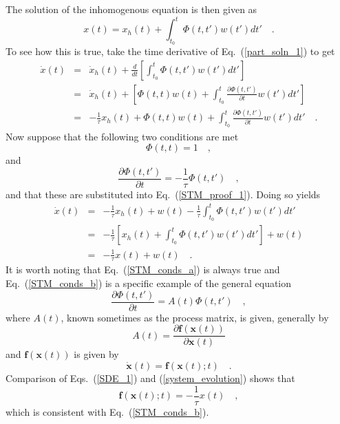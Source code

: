 \documentclass[10pt]{article}
\begin{document}
The solution of the inhomogenous equation is then given as
\begin{equation}\label{part_soln_1}
   x(t) = x_{h}(t) + \int_{t_{0}}^{t} \Phi(t,t') w(t') dt' \quad .
\end{equation}
To see how this is true, take the time derivative of Eq.\ (\ref{part_soln_1})
to get
\begin{eqnarray}\label{STM_proof_1}
  {\dot x}(t) & = & {\dot x}_{h}(t) + \frac{d}{dt} \left[ \int_{t_{0}}^{t} \Phi(t,t') w(t') dt' \right] \nonumber \\
              & = & {\dot x}_{h}(t) + \left[ \Phi(t,t) w(t) + \int_{t_{0}}^{t} \frac{\partial \Phi(t,t')}{\partial t} w(t') dt' \right] \nonumber \\
			  & = & -\frac{1}{\tau} x_{h}(t) + \Phi(t,t) w(t) + \int_{t_{0}}^{t} \frac{\partial \Phi(t,t')}{\partial t} w(t') dt' \quad .
\end{eqnarray}
Now suppose that the following two conditions are met
\begin{equation}\label{STM_conds_a}
   \Phi(t,t) = 1 \quad , 			
\end{equation}
and
\begin{equation}\label{STM_conds_b}
   \frac{\partial \Phi(t,t')}{\partial t} = -\frac{1}{\tau} \Phi(t,t') \quad ,
\end{equation}
and that these are substituted into Eq.\ (\ref{STM_proof_1}).  Doing so yields
\begin{eqnarray}\label{STM_proof_2}
  {\dot x}(t) & = & -\frac{1}{\tau} x_{h}(t) + w(t) - \frac{1}{\tau} \int_{t_{0}}^{t} \Phi(t,t') w(t') dt' \nonumber \\
              & = & -\frac{1}{\tau} \left[ x_{h}(t) + \int_{t_{0}}^{t} \Phi(t,t') w(t') dt' \right] + w(t) \nonumber \\
              & = & -\frac{1}{\tau} x(t) + w(t) \quad .
\end{eqnarray}
It is worth noting that Eq.\ (\ref{STM_conds_a}) is always true and Eq.\ (\ref{STM_conds_b}) is a 
specific example of the general equation
\begin{equation}\label{STM_evolution}
   \frac{\partial \Phi(t,t')}{\partial t} = A(t) \Phi(t,t') \quad ,
\end{equation}
where $A(t)$, known sometimes as the process matrix, is given, generally by
\begin{equation}
  A(t) = \frac{\partial {\mathbf f}( {\mathbf x} (t) ) }{\partial {\mathbf x}(t)} 
\end{equation}
and ${\mathbf f}( {\mathbf x} (t) )$ is given by
\begin{equation}\label{system_evolution}
   {\dot {\mathbf x}}(t) = {\mathbf f}( {\mathbf x}(t);t) \quad .
\end{equation}
Comparison of Eqs.\ (\ref{SDE_1}) and (\ref{system_evolution}) shows that
\begin{equation}\label{process_matrix_compare}
   {\mathbf f}( {\mathbf x} (t);t ) = -\frac{1}{\tau} x(t) \quad ,
\end{equation}
which is consistent with Eq.\ (\ref{STM_conds_b}).
\end{document}
